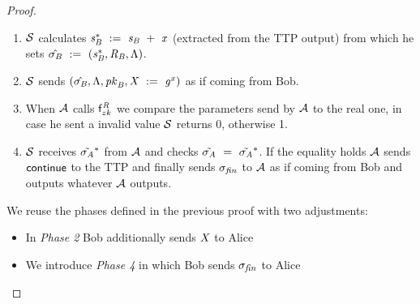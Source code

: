 \begin{proof}
\begin{enumerate}
        
        \item $\mathcal{S}$ calculates $\mathit{s}_{\mathit{B}}^* ~:=~ \mathit{s}_{\mathit{B}} ~+~ \mathit{x}$ (extracted from the TTP output) from which he sets $\hat{\sigma_{\mathit{B}}} ~:=~ (\mathit{s}_{\mathit{B}}^*, \mathit{R}_{\mathit{B}}, \Lambda)$.
        \item $\mathcal{S}$ sends $(\hat{\sigma_{\mathit{B}}}, \Lambda, \mathit{pk}_{\mathit{B}}, \mathit{X} ~:=~ \mathit{g}^{\mathit{x}})$ as if coming from Bob.
        \item When $\mathcal{A}$ calls $\mathsf{f}^{\mathit{R}}_{zk}$ we compare the parameters send by $\mathcal{A}$ to the real one, in case he sent a invalid value $\mathcal{S}$ returns 0, otherwise 1.
        \item $\mathcal{S}$ receives $\tilde{\sigma_{\mathit{A}}}^*$ from $\mathcal{A}$ and checks $\tilde{\sigma_{\mathit{A}}} ~=~ \tilde{\sigma_{\mathit{A}}}^*$.
        If the equality holds $\mathcal{A}$ sends $\mathsf{continue}$ to the TTP and finally sends $\sigma_{\mathit{fin}}$ to $\mathcal{A}$ as if coming from Bob and outputs whatever $\mathcal{A}$ outputs.
    \end{enumerate}

    We reuse the phases defined in the previous proof with two adjustments:
    \begin{itemize}
        \item In \textit{Phase 2} Bob additionally sends $\mathit{X}$ to Alice
        \item We introduce \textit{Phase 4} in which Bob sends $\sigma_{\mathit{fin}}$ to Alice
    \end{itemize}
    
    


\end{proof}

